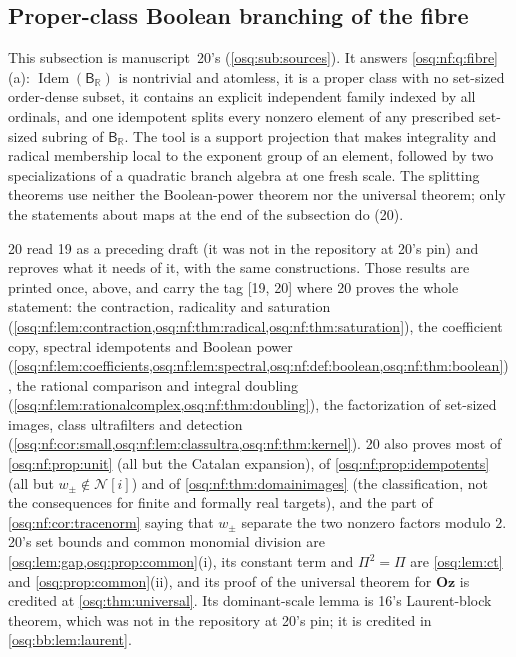\documentclass[11pt,letterpaper]{article}
\numberwithin{equation}{section}
\theoremstyle{definition}
\theoremstyle{remark}
\theoremstyle{plain}
\newcommand{\Oz}{\mathbf{Oz}}
\newcommand{\R}{\mathbb R}
\newcommand{\NN}{\mathcal N}         %
\newcommand{\Idem}{\operatorname{Idem}}
\newcommand{\src}[1]{\textup{\textsf{[#1]}}}
\begin{document}
\subsection{Proper-class Boolean branching of the fibre}\label{osq:bb:sub:branching}

This subsection is manuscript~20's (\cref{osq:sub:sources}). It answers \cref{osq:nf:q:fibre}(a): $\Idem(\mathsf B_\R)$ is
nontrivial and atomless, it is a proper class with no set-sized order-dense subset, it contains an explicit independent family
indexed by all ordinals, and one idempotent splits every nonzero element of any prescribed set-sized subring of $\mathsf B_\R$. The
tool is a support projection that makes integrality and radical membership local to the exponent group of an element, followed by
two specializations of a quadratic branch algebra at one fresh scale. The splitting theorems use neither the Boolean-power theorem
nor the universal theorem; only the statements about maps at the end of the subsection do (20).

20 read 19 as a preceding draft (it was not in the repository at 20's pin) and reproves what it needs of it, with the same
constructions. Those results are printed once, above, and carry the tag \src{19, 20} where 20 proves the whole statement: the
contraction, radicality and saturation (\cref{osq:nf:lem:contraction,osq:nf:thm:radical,osq:nf:thm:saturation}), the coefficient
copy, spectral idempotents and Boolean power (\cref{osq:nf:lem:coefficients,osq:nf:lem:spectral,osq:nf:def:boolean,osq:nf:thm:boolean}),
the rational comparison and integral doubling (\cref{osq:nf:lem:rationalcomplex,osq:nf:thm:doubling}), the factorization of
set-sized images, class ultrafilters and detection (\cref{osq:nf:cor:small,osq:nf:lem:classultra,osq:nf:thm:kernel}). 20 also
proves most of \cref{osq:nf:prop:unit} (all but the Catalan expansion), of \cref{osq:nf:prop:idempotents} (all but $w_\pm\notin\NN[i]$)
and of \cref{osq:nf:thm:domainimages} (the classification, not the consequences for finite and formally real targets), and the part of
\cref{osq:nf:cor:tracenorm} saying that $w_\pm$ separate the two nonzero factors modulo $2$. 20's set bounds and common
monomial division are \cref{osq:lem:gap,osq:prop:common}(i), its constant term and $\Pi^2=\Pi$ are \cref{osq:lem:ct} and
\cref{osq:prop:common}(ii), and its proof of the universal theorem for $\Oz$ is credited at \cref{osq:thm:universal}. Its
dominant-scale lemma is 16's Laurent-block theorem, which was not in the repository at 20's pin; it is credited in
\cref{osq:bb:lem:laurent}.
\end{document}
